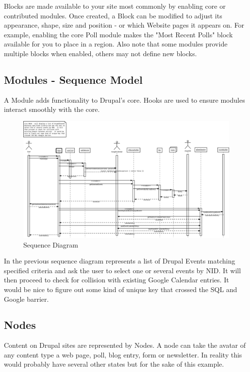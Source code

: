 Blocks are made available to your site most commonly by enabling core or contributed modules. Once created, a Block can be modified to adjust its appearance, shape, size and position - or which Website pages it appears on. For example, enabling the core Poll module makes the "Most Recent Polls" block available for you to place in a region. Also note that some modules provide multiple blocks when enabled, others may not define new blocks.

\subsection{Modules - Sequence Model}

A Module adds functionality to Drupal’s core. Hooks are used to ensure modules interact smoothly with the core.

\begin{figure}[H]
\centering
\includegraphics[width=14cm]{Chapter2/sequence_diagram.png}
\caption{Sequence Diagram}
\label{fig:sequence_diagram}
\end{figure}

In the previous sequence diagram represents a list of Drupal Events matching specified criteria and ask the user to select one or several events by NID. It will then proceed to check for collision with existing Google Calendar entries. It would be nice to figure out some kind of unique key that crossed the SQL and Google barrier.


\subsection{Nodes}
Content on Drupal sites are represented by Nodes. A node can take the avatar of any content type a web page, poll, blog entry, form or newsletter. In reality this would probably have several other states but for the sake of this example.

